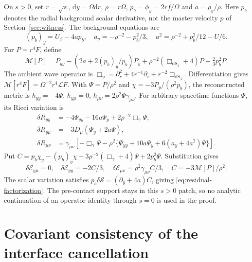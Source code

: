 \documentclass[11pt]{article}
\theoremstyle{remark}
\newcommand{\dd}{\mathrm d}
\begin{document}
On $s>0$, set $r=\sqrt s$, $\dd y=\Omega\dd r$,
$\rho=r\Omega$, $p_b=\phi_y=2rf/\Omega$ and $a=\rho_y/\rho$.
Here $p_b$ denotes the radial background scalar derivative, not the master
velocity $p$ of Section~\ref{sec:witness}. The background equations are
\begin{equation}
 (p_b)_y=U_\phi-4ap_b,\quad
 a_y=-\rho^{-2}-p_b^2/3,\quad
 a^2=\rho^{-2}+p_b^2/12-U/6.
\end{equation}
For $P=r^4F$, define
\begin{equation}
 \mathcal M[P]=P_{yy}-(2a+2(p_b)_y/p_b)P_y
  +\rho^{-2}(\Box_{\mathrm{dS}_4}+4)P-\tfrac23p_b^2P.
\end{equation}
The ambient wave operator is
$\Box_\eta=\partial_r^2+4r^{-1}\partial_r+
r^{-2}\Box_{\mathrm{dS}_4}$. Differentiation gives
$\mathcal M[r^4F]=\Omega^{-2}r^4\mathscr L F$.
With $\Psi=P/\rho^2$ and $\chi=-3P_y/(\rho^2p_b)$,
the reconstructed metric is
$h_{yy}=-4\Psi$, $h_{y\mu}=0$,
$h_{\mu\nu}=2\rho^2\Psi\gamma_{\mu\nu}$.
For arbitrary spacetime functions $\Psi$, its Ricci variation is
\begin{align}
 \delta R_{yy}&=-4\Psi_{yy}-16a\Psi_y+2\rho^{-2}\Box_\gamma\Psi,\nonumber\\
 \delta R_{y\mu}&=-3D_\mu(\Psi_y+2a\Psi),\nonumber\\
 \delta R_{\mu\nu}&=\gamma_{\mu\nu}
 \left[-\Box_\gamma\Psi-\rho^2\{\Psi_{yy}+10a\Psi_y
                      +6(a_y+4a^2)\Psi\}\right].
\end{align}
Put
$C=p_b\chi_y-(p_b)_y\chi-3\rho^{-2}(\Box_\gamma+4)\Psi
+2p_b^2\Psi$.
Substitution gives
\begin{equation}
 \delta\mathscr E_{y\mu}=0,\quad
 \delta\mathscr E_{yy}=-2C/3,\quad
 \delta\mathscr E_{\mu\nu}=\rho^2\gamma_{\mu\nu}C/3,\quad
 C=-3\mathcal M[P]/\rho^2.
\end{equation}
The scalar variation satisfies
$p_b\delta\mathscr S=(\partial_y+4a)C$, giving
\eqref{eq:residual-factorization}. The pre-contact support stays in this
$s>0$ patch, so no analytic continuation of an operator identity through
$s=0$ is used in the proof.

\section{Covariant consistency of the interface cancellation}
\label{app:covariant}
\end{document}
